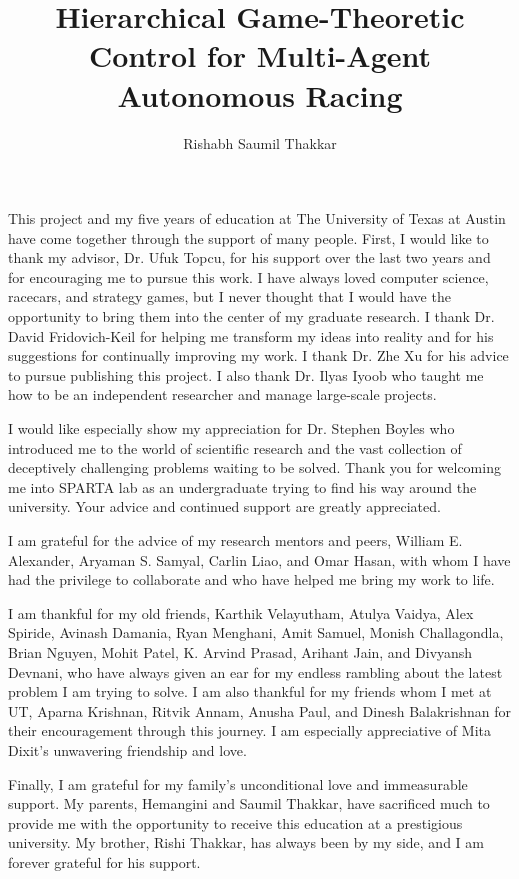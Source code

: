 \documentclass[12pt]{report}
\author{Rishabh Saumil Thakkar}  	%
\title{Hierarchical Game-Theoretic Control for Multi-Agent Autonomous Racing}
\theoremstyle{definition}
\theoremstyle{remark}
\numberwithin{equation}{section}
\begin{document}
\copyrightpage
\commcertpage
\titlepage
\begin{acknowledgments}	
This project and my five years of education at The University of Texas at Austin have come together through the support of many people. First, I would like to thank my advisor, Dr. Ufuk Topcu, for his support over the last two years and for encouraging me to pursue this work. I have always loved computer science, racecars, and strategy games, but I never thought that I would have the opportunity to bring them into the center of my graduate research. I thank Dr. David Fridovich-Keil for helping me transform my ideas into reality and for his suggestions for continually improving my work. I thank Dr. Zhe Xu for his advice to pursue publishing this project. I also thank Dr. Ilyas Iyoob who taught me how to be an independent researcher and manage large-scale projects.

I would like especially show my appreciation for Dr. Stephen Boyles who introduced me to the world of scientific research and the vast collection of deceptively challenging problems waiting to be solved. Thank you for welcoming me into SPARTA lab as an undergraduate trying to find his way around the university. Your advice and continued support are greatly appreciated. 

I am grateful for the advice of my research mentors and peers, William E. Alexander, Aryaman S. Samyal, Carlin Liao, and Omar Hasan, with whom I have had the privilege to collaborate and who have helped me bring my work to life.

I am thankful for my old friends, Karthik Velayutham, Atulya Vaidya, Alex Spiride, Avinash Damania, Ryan Menghani, Amit Samuel, Monish Challagondla, Brian Nguyen, Mohit Patel, K. Arvind Prasad, Arihant Jain, and Divyansh Devnani, who have always given an ear for my endless rambling about the latest problem I am trying to solve. I am also thankful for my friends whom I met at UT, Aparna Krishnan, Ritvik Annam, Anusha Paul, and Dinesh Balakrishnan for their encouragement through this journey. I am especially appreciative of Mita Dixit's unwavering friendship and love. 

Finally, I am grateful for my family's unconditional love and immeasurable support. My parents, Hemangini and Saumil Thakkar, have sacrificed much to provide me with the opportunity to receive this education at a prestigious university. My brother, Rishi Thakkar, has always been by my side, and I am forever grateful for his support. 
\end{acknowledgments}
\end{document}
